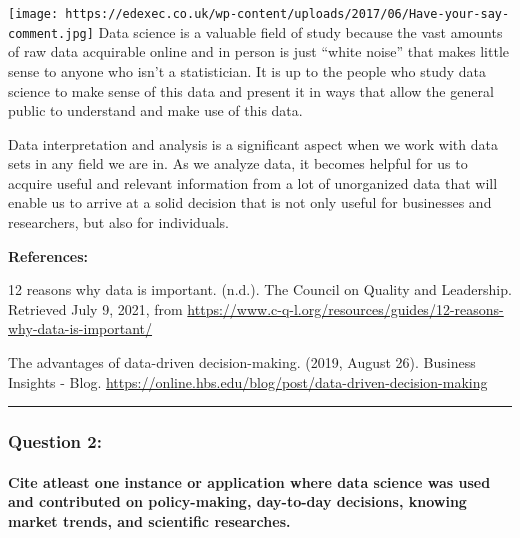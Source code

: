 \documentclass[
]{article}
\begin{document}
\texttt{[image: https://edexec.co.uk/wp-content/uploads/2017/06/Have-your-say-comment.jpg]}
Data science is a valuable field of study because the vast amounts of
raw data acquirable online and in person is just ``white noise'' that
makes little sense to anyone who isn't a statistician. It is up to the
people who study data science to make sense of this data and present it
in ways that allow the general public to understand and make use of this
data.

Data interpretation and analysis is a significant aspect when we work
with data sets in any field we are in. As we analyze data, it becomes
helpful for us to acquire useful and relevant information from a lot of
unorganized data that will enable us to arrive at a solid decision that
is not only useful for businesses and researchers, but also for
individuals.

\textbf{References:}

12 reasons why data is important. (n.d.). The Council on Quality and
Leadership. Retrieved July 9, 2021, from
\url{https://www.c-q-l.org/resources/guides/12-reasons-why-data-is-important/}

The advantages of data-driven decision-making. (2019, August 26).
Business Insights - Blog.
\url{https://online.hbs.edu/blog/post/data-driven-decision-making}

\begin{center}\rule{0.5\linewidth}{0.5pt}\end{center}

\hypertarget{question-2}{%
\subsubsection{\texorpdfstring{\textbf{Question
2:}}{Question 2:}}\label{question-2}}

\hypertarget{cite-atleast-one-instance-or-application-where-data-science-was-used-and-contributed-on-policy-making-day-to-day-decisions-knowing-market-trends-and-scientific-researches.}{%
\paragraph{Cite atleast one instance or application where data science
was used and contributed on policy-making, day-to-day decisions, knowing
market trends, and scientific
researches.}\label{cite-atleast-one-instance-or-application-where-data-science-was-used-and-contributed-on-policy-making-day-to-day-decisions-knowing-market-trends-and-scientific-researches.}}
\end{document}
